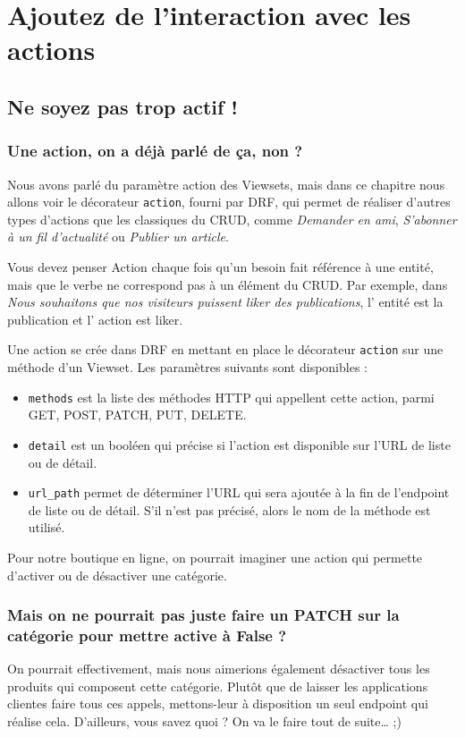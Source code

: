 \documentclass[a4paper]{article}
\begin{document}
\section{Ajoutez de l’interaction avec les actions}
\subsection{Ne soyez pas trop actif !}
\subsubsection*{Une action, on a déjà parlé de ça, non ?}
Nous avons parlé du paramètre action  des Viewsets, mais dans ce chapitre nous allons voir le {\color{monOrange}décorateur} {\tt action},  fourni par DRF, qui permet de réaliser d’autres types d’actions que les classiques du CRUD, comme {\em Demander en ami}, {\em S’abonner à un fil d’actualité} ou {\em Publier un article}.

Vous devez penser  {\color{monOrange}Action} chaque fois qu’un besoin fait référence à une entité, mais que le verbe ne correspond pas à un élément du CRUD. Par exemple, dans {\em Nous souhaitons que nos visiteurs puissent liker des publications}, l’ {\color{monOrange}entité est la publication} et l’ {\color{monOrange}action est liker}.

Une action se crée dans DRF en mettant en place le décorateur {\tt action}  sur une méthode d’un Viewset. Les paramètres suivants sont disponibles :
\begin{itemize}
\item {\tt methods}  est la liste des méthodes HTTP qui appellent cette action, parmi GET, POST, PATCH, PUT, DELETE.
\item {\tt detail}  est un booléen qui précise si l’action est disponible sur l’URL de liste ou de détail.
\item {\tt url\_path}  permet de déterminer l’URL qui sera ajoutée à la fin de l'endpoint de liste ou de détail. S'il n’est pas précisé, alors le nom de la méthode est utilisé.
\end{itemize}
Pour notre boutique en ligne, on pourrait imaginer une action qui permette d’{\color{monOrange}activer} ou de désactiver une catégorie.

\subsubsection*{Mais on ne pourrait pas juste faire un PATCH sur la catégorie pour mettre active  à False  ?}
On pourrait effectivement, mais nous aimerions également désactiver tous les produits qui composent cette catégorie. Plutôt que de laisser les applications clientes faire tous ces appels, mettons-leur à disposition {\color{monOrange}un seul endpoint} qui réalise cela. D’ailleurs, vous savez quoi ? On va le faire tout de suite… ;)
\end{document}
